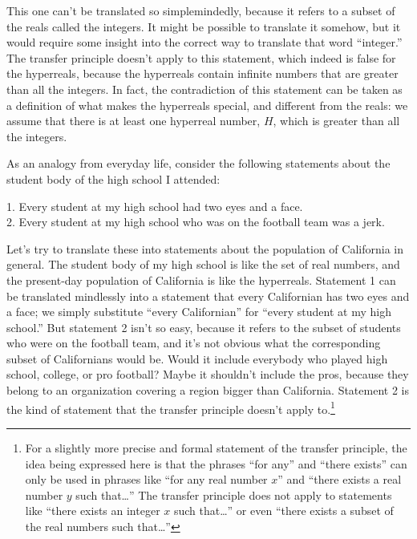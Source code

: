 This one can't be translated so simplemindedly, because it refers to a subset of the reals called
the integers. It might be possible to translate it somehow, but it would require some insight into
the correct way to translate that word ``integer.'' The transfer principle doesn't apply to this
statement, which indeed is false for the hyperreals, because the hyperreals contain infinite
numbers that are greater than all the integers. In fact, the contradiction of this statement can be
taken as a definition of what makes the hyperreals special, and different from the reals: we assume
that there is at least one hyperreal number, $H$, which is greater than all the integers.

As an analogy from everyday life, consider the following statements about the student body of the
high school I attended:

\begin{indentedblock}
1. Every student at my high school had two eyes and a face.\\
2. Every student at my high school who was on the football team was a jerk.
\end{indentedblock}

Let's try to translate these into statements about the population of California in general.
The student body of my high school is like the set of real numbers, and the present-day population
of California is like the hyperreals. Statement 1 can be translated mindlessly into a statement
that every Californian has two eyes and a face; we simply substitute ``every Californian'' for
``every student at my high school.'' But statement 2 isn't so easy, because it refers to the
subset of students who were on the football team, and it's not obvious what the corresponding
subset of Californians would be. Would it include everybody who played high school, college,
or pro football? Maybe it shouldn't include the pros, because they belong to an organization
covering a region bigger than California. Statement 2 is the kind of statement that the
transfer principle doesn't apply to.\footnote{For a slightly more precise and formal statement
of the transfer principle, the idea being expressed here is that the phrases ``for any'' and
``there exists'' can only be used in phrases like ``for any real number $x$'' and ``there exists
a real number $y$ such that\ldots'' The transfer principle does not apply to statements like ``there exists
an integer $x$ such that\ldots'' or even ``there exists a subset of the real numbers such that\ldots''}

